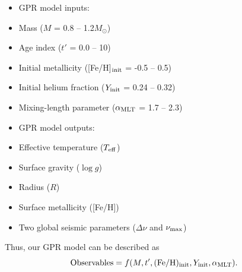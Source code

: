 \begin{itemize}
\item GPR model inputs:
\item[] Mass ($M$ = 0.8 -- 1.2$M_{\odot}$)
\item[] Age index ($t'$ = 0.0 -- 10)
\item[] Initial metallicity ([Fe/H]$_{\rm init}$ = -0.5 -- 0.5)
\item[] Initial helium fraction ($Y_{\rm init}$ = 0.24 -- 0.32)
\item[] Mixing-length parameter ($\alpha_{\rm MLT}$ = 1.7 -- 2.3)
\item GPR model outputs: 
\item[] Effective temperature ($T_{\rm eff}$) 
\item[] Surface gravity ($\log g$)
\item[] Radius ($R$)
\item[] Surface metallicity ([Fe/H])
\item[] Two global seismic parameters ($\Delta\nu$ and $\nu_{\rm max}$)  
\end{itemize}
Thus, our GPR model can be described as 
\begin{equation}\label{gprmodel}
{\rm Observables} = f(M, t', ({\rm Fe/H})_{\rm init}, Y_{\rm init}, \alpha_{\rm MLT}). 
\end{equation}

